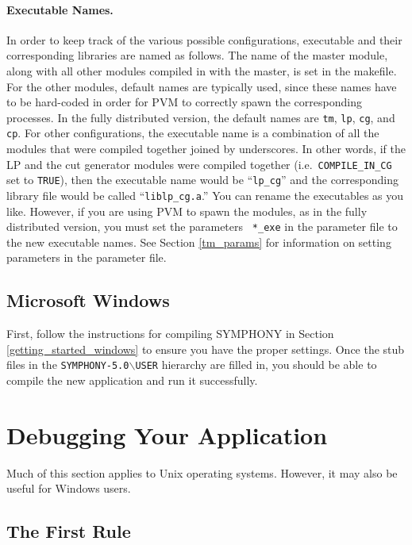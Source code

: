 \paragraph{Executable Names.}
\label{exe_names}
In order to keep track of the various possible configurations, executable and
their corresponding libraries are named as follows. The name of the master
module, along with all other modules compiled in with the master, is set in
the makefile. For the other modules, default names are typically used, since
these names have to be hard-coded in order for PVM to correctly spawn the
corresponding processes.  In the fully distributed version, the default names
are \texttt{tm}, \texttt{lp}, \texttt{cg}, and \texttt{cp}. For other
configurations, the executable name is a combination of all the modules that
were compiled together joined by underscores. In other words, if the LP and
the cut generator modules were compiled together (i.e.~{\tt COMPILE\_IN\_CG}
set to {\tt TRUE}), then the executable name would be ``{\tt lp\_cg}'' and the
corresponding library file would be called ``{\tt liblp\_cg.a}.'' You can
rename the executables as you like. However, if you are using PVM to spawn the
modules, as in the fully distributed version, you must set the parameters {\tt
*\_exe} in the parameter file to the new executable names. See Section
\ref{tm_params} for information on setting parameters in the parameter file.

\subsection{Microsoft Windows}

First, follow the instructions for compiling SYMPHONY in Section
\ref{getting_started_windows} to ensure you have the proper settings. Once the
stub files in the {\tt SYMPHONY-5.0$\backslash$USER} hierarchy are
filled in, you should be able to compile the new application and run it
successfully. 

\section{Debugging Your Application}

Much of this section applies to Unix operating systems. However, it may
also be useful for Windows users.

\subsection{The First Rule}

